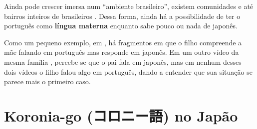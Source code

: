 \documentclass{article}
\newcommand{\jap}[1]{#1}
\newcommand{\keyword}[1]{\textbf{#1}}
\newcommand{\koroniago}{\jap{コロニー語}}
\begin{document}
Ainda pode crescer imersa num ``ambiente brasileiro'',
existem comunidades e até bairros inteiros de brasileiros
\cite{japaoimigrantesbrasileiros} \cite{escolasbrjp}
\cite{regioesmaisbrjp}
\cite{videobairrojpcarla} \cite{videobairrojpfernando}
\cite{videocidadebr}.
Dessa forma, ainda há a possibilidade de
ter o português como \keyword{língua materna}
enquanto sabe pouco ou nada de japonês.

Como um pequeno exemplo,
em \cite{videobairrojpcarla},
há fragmentos em que o filho compreende a mãe falando
em português mas responde em japonês.
Em um outro vídeo da mesma família \cite{videoramencarla},
percebe-se que o pai fala em japonês,
mas em nenhum desses dois vídeos
o filho falou algo em português,
dando a entender que sua situação
se parece mais o primeiro caso.

\section{Koronia-go (\koroniago{}) no Japão}

\newpage

\nocite{*}


\end{document}
